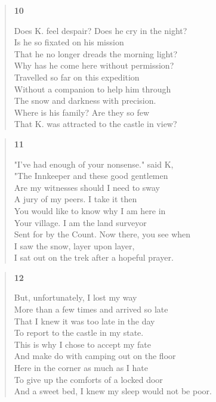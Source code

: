 \documentclass{article}
\begin{document}
\begin{verse}
  \begin{center}
    \textbf{10} \\
  \end{center}
  Does K. feel despair? Does he cry in the night? \\
  Is he so fixated on his mission \\
  That he no longer dreads the morning light? \\
  Why has he come here without permission? \\
  Travelled so far on this expedition \\
  Without a companion to help him through \\
  The snow and darkness with precision. \\
  Where is his family? Are they so few \\
  That K. was attracted to the castle in view?
\end{verse}
\begin{verse}
  \begin{center}
    \textbf{11} \\
  \end{center}
  "I've had enough of your nonsense." said K, \\
  "The Innkeeper and these good gentlemen \\
  Are my witnesses should I need to sway \\
  A jury of my peers. I take it then \\
  You would like to know why I am here in \\
  Your village. I am the land surveyor \\
  Sent for by the Count. Now there, you see when \\
  I saw the snow, layer upon layer, \\
  I sat out on the trek after a hopeful prayer.
\end{verse}
\newpage
\begin{verse}
  \begin{center}
    \textbf{12} \\
  \end{center}
  But, unfortunately, I lost my way \\
  More than a few times and arrived so late \\
  That I knew it was too late in the day \\
  To report to the castle in my state. \\
  This is why I chose to accept my fate \\
  And make do with camping out on the floor \\
  Here in the corner as much as I hate \\
  To give up the comforts of a locked door \\
  And a sweet bed, I knew my sleep would not be poor.
\end{verse}
\end{document}
